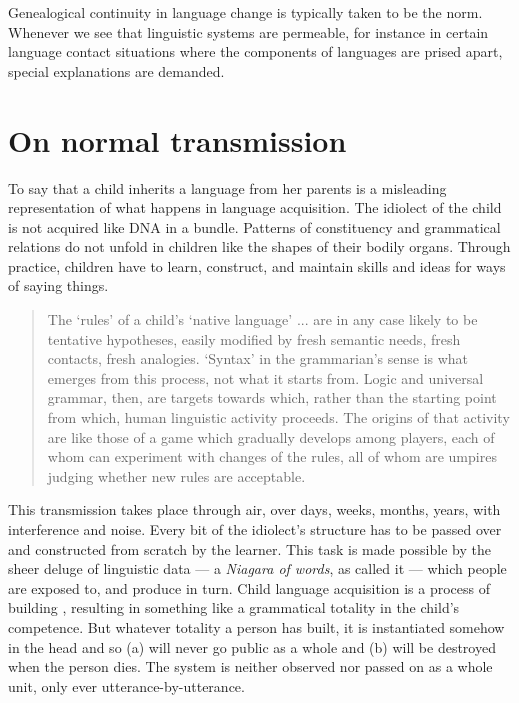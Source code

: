 Genealogical continuity in language change is typically taken to be the 
norm. Whenever we see that linguistic systems are permeable, for instance in certain language contact situations where the 
components of languages are prised apart, special explanations are 
demanded. 

\section{On normal transmission}

To say that a child inherits a language from her parents is a misleading representation of what happens in language acquisition. The idiolect of the child is not acquired like DNA in a bundle. Patterns of constituency and grammatical relations do not unfold in children like the shapes of their bodily organs. Through practice, children have to learn, construct, and maintain skills and ideas for ways of saying things. 

\begin{quotation}
The \textquoteleft rules' of a child's \textquoteleft native language' ... are in any case likely to be tentative hypotheses, easily modified by fresh semantic needs, fresh contacts, fresh analogies. \textquoteleft Syntax' in the grammarian's sense is what emerges from this process, not what it starts from. \citep[190]{le_page_acts_1985} Logic and universal grammar, then, are targets towards which, rather than the starting point from which, human linguistic activity proceeds. The origins of that activity are like those of a game which gradually develops among players, each of whom can experiment with changes of the rules, all of whom are umpires judging whether new rules are acceptable. \citep[197]{le_page_acts_1985} 
\end{quotation}

This transmission takes place through air, over days, weeks, months, years, with interference and noise. Every bit of the idiolect's structure has to be passed over and constructed from scratch by the learner. This task is made possible by the sheer deluge of linguistic data --- a \textit{Niagara of words}, as \citet[12ff]{hayakawa_language_1978} called it --- which people are exposed to, and produce in turn. Child language acquisition is a process of building \citep{tomasello_constructing_2003}, resulting in something like a grammatical totality in the child's competence. But whatever totality a person has built, it is instantiated somehow in the head and so (a) will never go public as a whole and (b) will be destroyed when the person dies. The system is neither observed nor passed on as a whole unit, only ever utterance-by-utterance.

